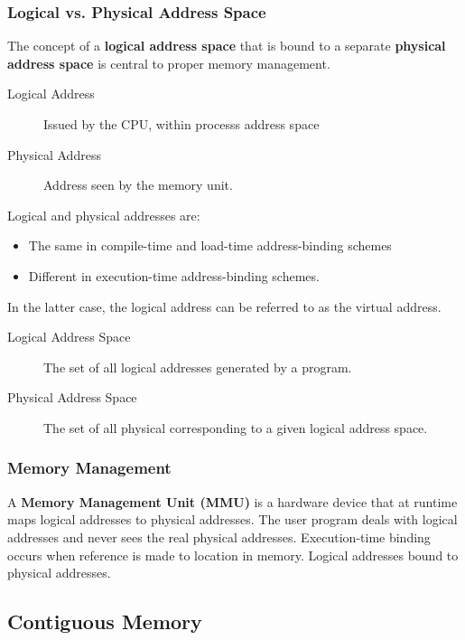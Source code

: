 \documentclass{article}%
\begin{document}
\subsubsection{Logical vs. Physical Address Space}
\label{sec:org799edcc}
The concept of a \textbf{logical address space} that is bound to a separate \textbf{physical address space} is central to proper memory management.
\begin{description}
\item[{Logical Address}] Issued by the CPU, within processs address space
\item[{Physical Address}] Address seen by the memory unit.
\end{description}

Logical and physical addresses are:
\begin{itemize}
\item The same in compile-time and load-time address-binding schemes
\item Different in execution-time address-binding schemes.
\end{itemize}
In the latter case, the logical address can be referred to as the virtual address.
\begin{description}
\item[{Logical Address Space}] The set of all logical addresses generated by a program.
\item[{Physical Address Space}] The set of all physical corresponding to a given logical address space.
\end{description}

\subsubsection{Memory Management}
\label{sec:orgbf3b48d}
A \textbf{Memory Management Unit (MMU)} is a hardware device that at runtime maps logical addresses to physical addresses.
The user program deals with logical addresses and never sees the real physical addresses.
Execution-time binding occurs when reference is made to location in memory.
Logical addresses bound to physical addresses.

\subsection{Contiguous Memory}
\label{sec:org0ae368c}
\end{document}
